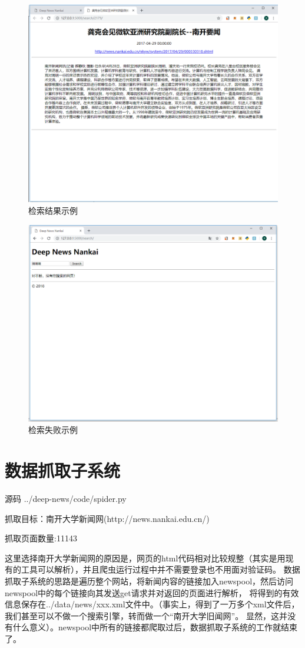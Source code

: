 \documentclass[12pt]{article}
\begin{document}
		\begin{figure}[htb]
			\centering
			\includegraphics[width=0.5\linewidth]{screenshot006}
			\caption[检索结果示例]{检索结果示例}
			\label{检索结果示例}
		\end{figure}
	
		\newpage
		
		\begin{figure}[htb]
			\centering
			\includegraphics[width=0.7\linewidth]{screenshot007}
			\caption[检索失败示例]{检索失败示例}
			\label{检索失败示例}
		\end{figure}
		
		
		\newpage
		
		\section{数据抓取子系统}
		
		源码 ../deep-news/code/spider.py
		
		抓取目标：南开大学新闻网(http://news.nankai.edu.cn/)
		
		抓取页面数量:11143
		
		这里选择南开大学新闻网的原因是，网页的html代码相对比较规整（其实是用现有的工具可以解析），并且爬虫运行过程中并不需要登录也不用面对验证码。
		数据抓取子系统的思路是遍历整个网站，将新闻内容的链接加入newspool，然后访问newspool中的每个链接向其发送get请求并对返回的页面进行解析，
		将得到的有效信息保存在../data/news/xxx.xml文件中。（事实上，得到了一万多个xml文件后，我们甚至可以不做一个搜索引擎，转而做一个“南开大学旧闻网”。
		显然，这并没有什么意义）。newspool中所有的链接都爬取过后，数据抓取子系统的工作就结束了。
		
\end{document}
